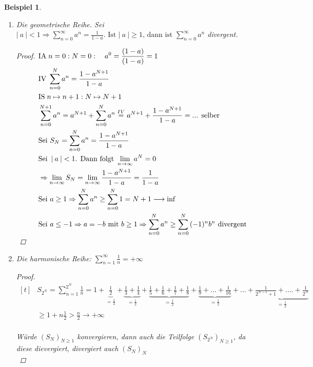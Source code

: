 \documentclass[a4paper,titlepage,oneside]{article}
\newcommand{\IA}[1][n=0]{\vspace{0.1pt}\ensuremath{\text{IA}\sp#1:}}
\newcommand{\IV}{\vspace{0.1pt}\ensuremath{\text{IV}\sp}}
\newcommand{\IS}[1][n \mapsto n+1]{\vspace{0.1pt}\ensuremath{\text{IS}\sp#1}}
\def\sp{\hspace{0,1cm}}
\newcommand{\suminf}[2][n]{\ensuremath{\sum_{#1= 0}^{\infty}{#2}}}
\renewcommand{\liminf}[2][n]{\ensuremath{\lim\limits_{#1 \rightarrow \infty}{#2}}}
\newcommand{\abs}[1]{\ensuremath{\left|\:#1\:\right|}}
\theoremstyle{thmstyle}
\newtheorem{bsp}[satz]{Beispiel}
\begin{document}
\begin{bsp}\
\begin{enumerate}
\item Die geometrische Reihe. Sei \(\abs{a} < 1 \Rightarrow \suminf{a^n} = \frac{1}{1-a}\text{. Ist }\abs{a} \ge 1\text{, dann ist }\suminf{a^n}\) divergent.
\begin{proof}$\begin{aligned}[t]
&\IA {N=0}: \quad a^0 = \frac{(1-a)}{(1- a)} = 1\\
&\IV \sum_{n = 0}^{N}{a^n} = \frac{1-a^{N+1}}{1-a}\\
&\IS: {N \mapsto N+1}\\
&\sum_{n = 0}^{N+1}{a^n} = a^{N+1} + \sum_{n = 0}^{N}{a^n} \overset{IV}{=} a^{N+1} + \frac{1-a^{N+1}}{1-a} = \text{... selber} \\ %
&\text{Sei }S_N = \sum_{n=0}^{N}{a^n} = \frac{1 - a^{N+1}}{1- a} \\
&\text{Sei }\abs{a} < 1\text{. Dann folgt }\liminf{a^N} = 0 \\
&\Rightarrow \liminf{S_N} = \liminf{\frac{1-a^{N+1}}{1-a}} = \frac{1}{1-a}\\
&\text{Sei }a \ge 1 \Rightarrow \sum_{n=0}^{N}{a^n} \ge \sum_{n=0}^{N}{1} = N+1 \longrightarrow \inf \\
&\text{Sei }a \le -1 \Rightarrow a = -b \text{ mit }b \ge 1 \Rightarrow \sum_{n=0}^{N}{a^n} \ge \sum_{n=0}^{N}{(-1)^nb^n} \text{ divergent}
\end{aligned}$\\
\end{proof}

\item Die harmonische Reihe: \(\sum_{n=1}^{\infty}{\frac{1}{n}} = +\infty\)
\begin{proof}
$\begin{aligned}[t]
&S_{2^N} = \sum_{n = 1}^{2^N}{\frac{1}{n}} =
1 +\underbrace{\frac{1}{2}}_{=\frac{1}{2}} + \underbrace{\frac{1}{3} + \frac{1}{4}}_{=\frac{1}{2}} + \underbrace{\frac{1}{5} + \frac{1}{6} + \frac{1}{7} + \frac{1}{8}}_{=\frac{1}{2}} + \underbrace{\frac{1}{9} + ... + \frac{1}{16}}_{=\frac{1}{2}} + ... + \underbrace{\frac{1}{2^{N-1}+1}+ .... + \frac{1}{2^N}}_{=\frac{1}{2}} \\
&\ge 1 + n \frac{1}{2} > \frac{n}{2} \longrightarrow +\infty
\end{aligned}$
\\\\
Würde \((S_N)_{N\ge1}\) konvergieren, dann auch die Teilfolge \((S_{2^N})_{N \ge 1}\), da diese dievergiert, divergiert auch \((S_N)_N\)\\
\end{proof}


\end{enumerate}
\end{bsp}
\end{document}
